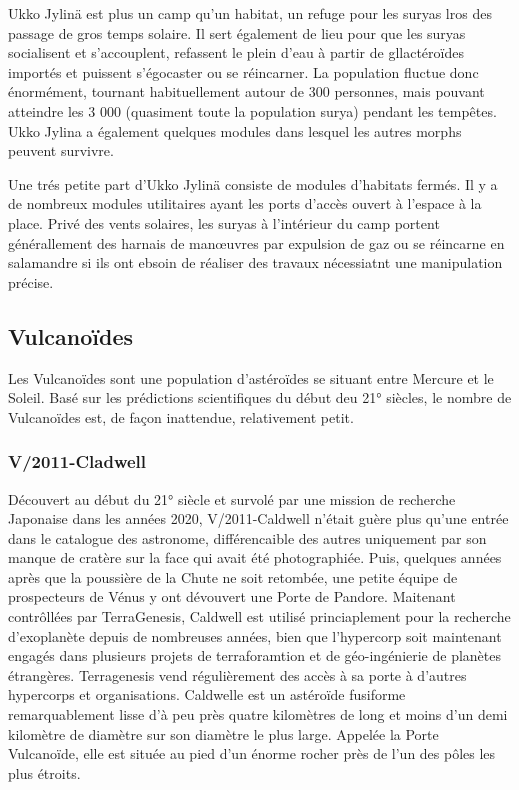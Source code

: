                                                       Ukko Jylinä est plus un camp qu'un habitat, un refuge pour les suryas lros des passage de gros temps solaire. Il sert également de lieu pour que les suryas socialisent et s'accouplent, refassent le plein d'eau à partir de gllactéroïdes importés et puissent s'égocaster ou se réincarner. La population fluctue donc énormément, tournant habituellement autour de 300 personnes, mais pouvant atteindre les 3 000 (quasiment toute la population surya) pendant les tempêtes. Ukko Jylina a également quelques modules dans lesquel les autres morphs peuvent survivre. 

                                                      Une trés petite part d'Ukko Jylinä consiste de modules d'habitats fermés. Il y a de nombreux modules utilitaires ayant les ports d'accès ouvert à l'espace à la place. Privé des vents solaires, les suryas à l'intérieur du camp portent générallement des harnais de manœuvres par expulsion de gaz ou se réincarne en salamandre si ils ont ebsoin de réaliser des travaux nécessiatnt une manipulation précise. 

                                                      \subsection{Vulcanoïdes} \label{sec:vulcanoids} 

                                                      Les Vulcanoïdes sont une population d'astéroïdes se situant entre Mercure et le Soleil. Basé sur les prédictions scientifiques du début deu 21° siècles, le nombre de Vulcanoïdes est, de façon inattendue, relativement petit. 

                                                      \subsubsection{V/2011-Cladwell} \label{sec:v2011-caldw} 

                                                      Découvert au début du 21° siècle et survolé par une mission de recherche Japonaise dans les années 2020, V/2011-Caldwell n'était guère plus qu'une entrée dans le catalogue des astronome, différencaible des autres uniquement par son manque de cratère sur la face qui avait été photographiée. Puis, quelques années après que la poussière de la Chute ne soit retombée, une petite équipe de prospecteurs de Vénus y ont dévouvert une Porte de Pandore. Maitenant contrôllées par TerraGenesis, Caldwell est utilisé princiaplement pour la recherche d'exoplanète depuis de nombreuses années, bien que l'hypercorp soit maintenant engagés dans plusieurs projets de terraforamtion et de géo-ingénierie de planètes étrangères. Terragenesis vend régulièrement des accès à sa porte à d'autres hypercorps et organisations. Caldwelle est un astéroïde fusiforme remarquablement lisse d'à peu près quatre kilomètres de long et moins d'un demi kilomètre de diamètre sur son diamètre le plus large. Appelée la Porte Vulcanoïde, elle est située au pied d'un énorme rocher près de l'un des pôles les plus étroits. 

